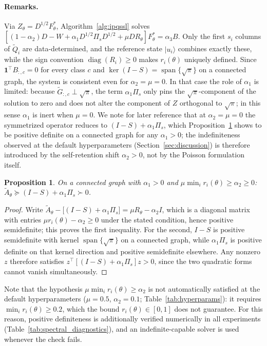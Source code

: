 \documentclass[11pt,a4paper]{article}
\newtheorem{proposition}{Proposition}
\begin{document}
\paragraph{Remarks.}
Via $Z_\theta=D^{1/2}F_\theta^{\ast}$, Algorithm~\ref{alg:ipqssl} solves
$[(1-\alpha_2)D-W+\alpha_1D^{1/2}\Pi_sD^{1/2}+\mu DR_\theta]
F_\theta^{\ast}=\alpha_3B$. Only the first $s_i$ columns of $\widetilde Q_i$ are
data-determined, and the reference state $|u_i\rangle$ combines exactly
these, while the sign convention $\operatorname{diag}(R_i)\ge 0$ makes
$r_i(\theta)$ uniquely defined. Since $\mathbf 1^{\top}B_{:,c}=0$ for every
class $c$ and $\ker(I-S)=\operatorname{span}\{\sqrt{\pi}\}$ on a connected
graph, the system is consistent even for $\alpha_2=\mu=0$. In that case the
role of $\alpha_1$ is limited: because
$\widetilde G_{:,c}\perp\sqrt{\pi}$, the term $\alpha_1\Pi_s$ only pins the
$\sqrt{\pi}$-component of the solution to zero and does not alter the
component of $Z$ orthogonal to $\sqrt{\pi}$; in this sense $\alpha_1$ is
inert when $\mu=0$.
We note for later reference that at $\alpha_2=\mu=0$ the symmetrized
operator reduces to $(I-S)+\alpha_1\Pi_s$, which
Proposition~\ref{prop:pd} shows to be positive definite on a connected
graph for any $\alpha_1>0$; the indefiniteness observed at the default
hyperparameters (Section~\ref{sec:discussion}) is therefore introduced by
the self-retention shift $\alpha_2>0$, not by the Poisson formulation
itself.

\begin{proposition}\label{prop:pd}
On a connected graph with $\alpha_1>0$ and
$\mu\min_i r_i(\theta)\ge\alpha_2\ge 0$:
$\widetilde A_\theta\succeq(I-S)+\alpha_1\Pi_s\succ 0$.
\end{proposition}

\begin{proof}
Write
$\widetilde A_\theta-\bigl[(I-S)+\alpha_1\Pi_s\bigr]
=\mu R_\theta-\alpha_2 I$,
which is a diagonal matrix with entries
$\mu r_i(\theta)-\alpha_2\ge 0$ under the stated condition, hence positive
semidefinite; this proves the first inequality. For the second, $I-S$ is
positive semidefinite with kernel $\operatorname{span}\{\sqrt{\pi}\}$ on a
connected graph, while $\alpha_1\Pi_s$ is positive definite on that kernel
direction and positive semidefinite elsewhere. Any nonzero $z$ therefore
satisfies $z^\top[(I-S)+\alpha_1\Pi_s]z>0$, since the two quadratic forms
cannot vanish simultaneously.
\end{proof}

\noindent
Note that the hypothesis $\mu\min_i r_i(\theta)\ge\alpha_2$ is not
automatically satisfied at the default hyperparameters
($\mu=0.5$, $\alpha_2=0.1$; Table~\ref{tab:hyperparams}): it requires
$\min_i r_i(\theta)\ge 0.2$, which the bound $r_i(\theta)\in[0,1]$ does not
guarantee. For this reason, positive definiteness is additionally verified
numerically in all experiments (Table~\ref{tab:spectral_diagnostics}), and
an indefinite-capable solver is used whenever the check fails.
\end{document}
